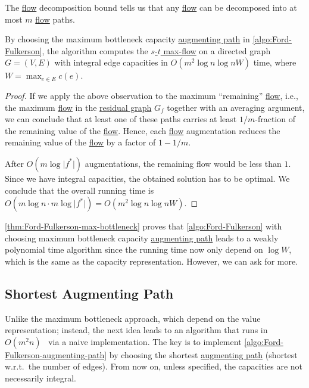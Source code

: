 \begin{prev}
	The \hyperref[def:flow]{flow} decomposition bound tells us that any \hyperref[def:flow]{flow} can be decomposed into at most \(m\) \hyperref[def:flow]{flow} paths.
\end{prev}

\begin{theorem}\label{thm:Ford-Fulkerson-max-bottleneck}
	By choosing the maximum bottleneck capacity \hyperref[def:augmenting-path]{augmenting path} in \autoref{algo:Ford-Fulkerson}, the algorithm computes the \hyperref[prb:s-t-max-flow]{\(s\)-\(t\) max-flow} on a directed graph \(G = (V, E)\) with integral edge capacities in \(O(m^2 \log n \log nW)\) time, where \(W = \max _{e \in E} c(e)\).
\end{theorem}
\begin{proof}
	If we apply the above observation to the maximum ``remaining'' \hyperref[def:flow]{flow}, i.e., the maximum \hyperref[def:flow]{flow} in the \hyperref[def:residual-graph]{residual graph} \(G_f\) together with an averaging argument, we can conclude that at least one of these paths carries at least \(1 / m\)-fraction of the remaining value of the \hyperref[def:flow]{flow}. Hence, each \hyperref[def:flow]{flow} augmentation reduces the remaining value of the \hyperref[def:flow]{flow} by a factor of \(1 - 1 / m\).

	After \(O(m \log \lvert f^{\ast} \rvert )\) augmentations, the remaining flow would be less than \(1\). Since we have integral capacities, the obtained solution has to be optimal. We conclude that the overall running time is \(O(m \log n \cdot m \log \lvert f^{\ast} \rvert ) = O(m^2 \log n \log nW)\).
\end{proof}

\autoref{thm:Ford-Fulkerson-max-bottleneck} proves that \autoref{algo:Ford-Fulkerson} with choosing maximum bottleneck capacity \hyperref[def:augmenting-path]{augmenting path} leads to a weakly polynomial time algorithm since the running time now only depend on \(\log W\), which is the same as the capacity representation. However, we can ask for more.

\subsection{Shortest Augmenting Path}
Unlike the maximum bottleneck approach, which depend on the value representation; instead, the next idea leads to an algorithm that runs in \(O(m^2 n)\)~\cite{dinic1970algorithm,edmonds1972theoretical} via a naive implementation. The key is to implement \autoref{algo:Ford-Fulkerson-augmenting-path} by choosing the shortest \hyperref[def:augmenting-path]{augmenting path} (shortest w.r.t.\ the number of edges). From now on, unless specified, the capacities are not necessarily integral.

